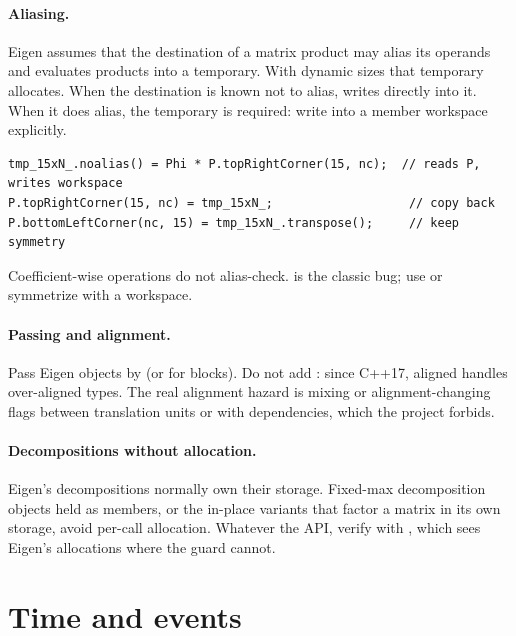 \paragraph{Aliasing.} Eigen assumes that the destination of a matrix product may alias its operands and evaluates products into a
temporary. With dynamic sizes that temporary allocates. When the destination is known not to alias,  writes directly
into it. When it does alias, the temporary is required: write into a member workspace explicitly.

\begin{lstlisting}
tmp_15xN_.noalias() = Phi * P.topRightCorner(15, nc);  // reads P, writes workspace
P.topRightCorner(15, nc) = tmp_15xN_;                   // copy back
P.bottomLeftCorner(nc, 15) = tmp_15xN_.transpose();     // keep symmetry
\end{lstlisting}

Coefficient-wise operations do not alias-check.  is the classic bug; use  or symmetrize
with a workspace.

\paragraph{Passing and alignment.} Pass Eigen objects by  (or  for blocks). Do not add
: since C++17, aligned  handles over-aligned types. The real alignment hazard is mixing
 or alignment-changing flags between translation units or with dependencies, which the project forbids.

\paragraph{Decompositions without allocation.} Eigen's decompositions normally own their storage. Fixed-max decomposition objects held as
members, or the in-place variants that factor a matrix in its own storage, avoid per-call allocation. Whatever the API, verify with
, which sees Eigen's allocations where the  guard cannot.

\section{Time and events}

